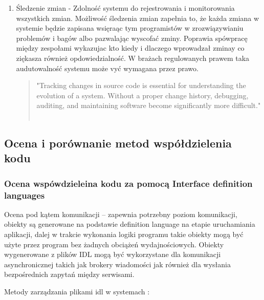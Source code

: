 \documentclass[runningheads,12pt]{llncs}
\begin{document}
\begin{enumerate}
    \item Śledzenie zmian - Zdolność systemu do rejestrowania i monitorowania wszystkich zmian. Możliwość śledzenia zmian zapełnia to, że każda zmiana w systemie będzie zapisana wsięraąc tym programistów w zrozwiązywianiu problemów i bagów albo pazwalając wyscofać zminy. Poprawia spówpracę między zespołami wykazujac kto kiedy i dlaczego wprowadzał zminay co ziękasza również opdowiedzialność. W brażach regulowanych prawem taka audutowalność systemu może vyć wymagana przez prawo. 
    \begin{quote}
        "Tracking changes in source code is essential for understanding the evolution of a system. Without a proper change history, debugging, auditing, and maintaining software become significantly more difficult." ~\cite[p. 150]{rubin2012essential}
    \end{quote}
\end{enumerate}

\subsection{Ocena i porównanie metod współdzielenia kodu}

\subsubsection{Ocena wspówdzieleina kodu za pomocą Interface definition languages}

Ocena pod kątem komunikacji – zapewnia potrzebny poziom komunikacji, obiekty są generowane na podstawie definition language na etapie uruchamiania aplikacji, dalej w trakcie wykonania logiki programu takie obiekty mogą być użyte przez program bez żadnych obciążeń wydajnościowych. Obiekty wygenerowane z plików IDL mogą być wykorzystane dla komunikacji asynchronicznej takich jak brokery wiadomości jak również dla wysłania bezpośrednich zapytań między serwisami.

Metody zarządzania plikami idl w systemach : 
\end{document}
